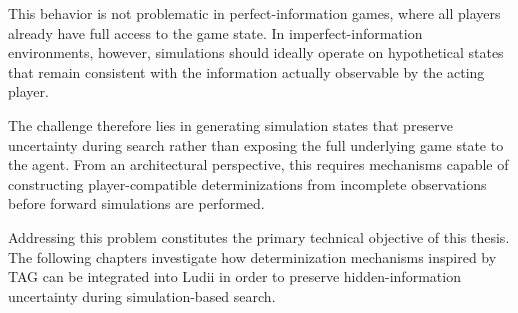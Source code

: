 This behavior is not problematic in perfect-information games, where all players already have full access to the game state. In imperfect-information environments, however, simulations should ideally operate on hypothetical states that remain consistent with the information actually observable by the acting player.

The challenge therefore lies in generating simulation states that preserve uncertainty during search rather than exposing the full underlying game state to the agent. From an architectural perspective, this requires mechanisms capable of constructing player-compatible determinizations from incomplete observations before forward simulations are performed.

Addressing this problem constitutes the primary technical objective of this thesis. The following chapters investigate how determinization mechanisms inspired by TAG can be integrated into Ludii in order to preserve hidden-information uncertainty during simulation-based search.

